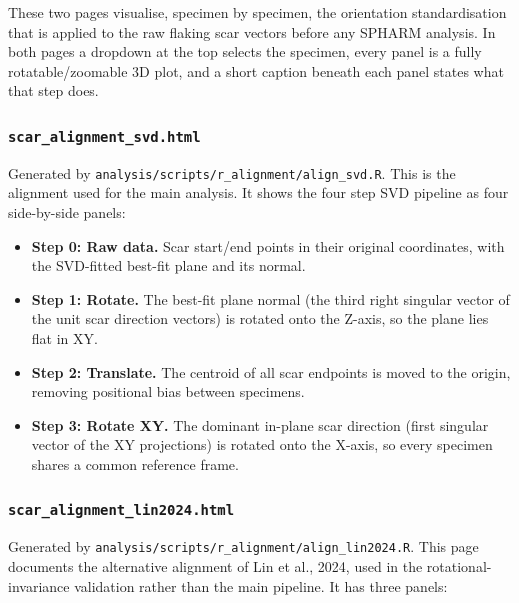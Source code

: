 \documentclass[
  letterpaper,
  DIV=11,
  numbers=noendperiod]{scrartcl}
\providecommand{\tightlist}{%
  \setlength{\itemsep}{0pt}\setlength{\parskip}{0pt}}
\begin{document}
These two pages visualise, specimen by specimen, the orientation
standardisation that is applied to the raw flaking scar vectors before
any SPHARM analysis. In both pages a dropdown at the top selects the
specimen, every panel is a fully rotatable/zoomable 3D plot, and a short
caption beneath each panel states what that step does.

\subsubsection{\texorpdfstring{\texttt{scar\_alignment\_svd.html}}{scar\_alignment\_svd.html}}\label{scar_alignment_svd.html}

Generated by \texttt{analysis/scripts/r\_alignment/align\_svd.R}. This
is the alignment used for the main analysis. It shows the four step SVD
pipeline as four side-by-side panels:

\begin{itemize}
\tightlist
\item
  \textbf{Step 0: Raw data.} Scar start/end points in their original
  coordinates, with the SVD-fitted best-fit plane and its normal.
\item
  \textbf{Step 1: Rotate.} The best-fit plane normal (the third right
  singular vector of the unit scar direction vectors) is rotated onto
  the Z-axis, so the plane lies flat in XY.
\item
  \textbf{Step 2: Translate.} The centroid of all scar endpoints is
  moved to the origin, removing positional bias between specimens.
\item
  \textbf{Step 3: Rotate XY.} The dominant in-plane scar direction
  (first singular vector of the XY projections) is rotated onto the
  X-axis, so every specimen shares a common reference frame.
\end{itemize}

\subsubsection{\texorpdfstring{\texttt{scar\_alignment\_lin2024.html}}{scar\_alignment\_lin2024.html}}\label{scar_alignment_lin2024.html}

Generated by \texttt{analysis/scripts/r\_alignment/align\_lin2024.R}.
This page documents the alternative alignment of Lin et al., 2024, used
in the rotational-invariance validation rather than the main pipeline.
It has three panels:
\end{document}
